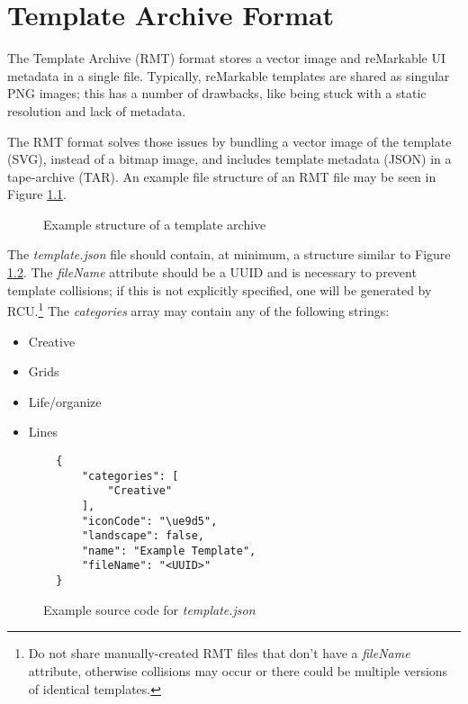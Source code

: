 \chapter{Template Archive Format}
\label{sec:templatearchiveformat}
The Template Archive (RMT) format stores a vector image and reMarkable UI metadata in a single file. Typically, reMarkable templates are shared as singular PNG images; this has a number of drawbacks, like being stuck with a static resolution and lack of metadata.

The RMT format solves those issues by bundling a vector image of the template (SVG), instead of a bitmap image, and includes template metadata (JSON) in a tape-archive (TAR). An example file structure of an RMT file may be seen in Figure \ref{fig:rmtstructure}.

\begin{figure}[h]
\caption{Example structure of a template archive}
\label{fig:rmtstructure}
\end{figure}

The \textit{template.json} file should contain, at minimum, a structure similar to Figure \ref{fig:exampletemplatejson}. The \textit{fileName} attribute should be a UUID and is necessary to prevent template collisions; if this is not explicitly specified, one will be generated by RCU.\footnote{Do not share manually-created RMT files that don't have a \textit{fileName} attribute, otherwise collisions may occur or there could be multiple versions of identical templates.} The \textit{categories} array may contain any of the following strings:

\begin{itemize}
\item{Creative}
\item{Grids}
\item{Life/organize}
\item{Lines}
\end{itemize}


\begin{figure}[h]
\begin{verbatim}
  {
      "categories": [
          "Creative"
      ],
      "iconCode": "\ue9d5",
      "landscape": false,
      "name": "Example Template",
      "fileName": "<UUID>"
  }
\end{verbatim}
\caption{Example source code for \textit{template.json}}
\label{fig:exampletemplatejson}
\end{figure}

